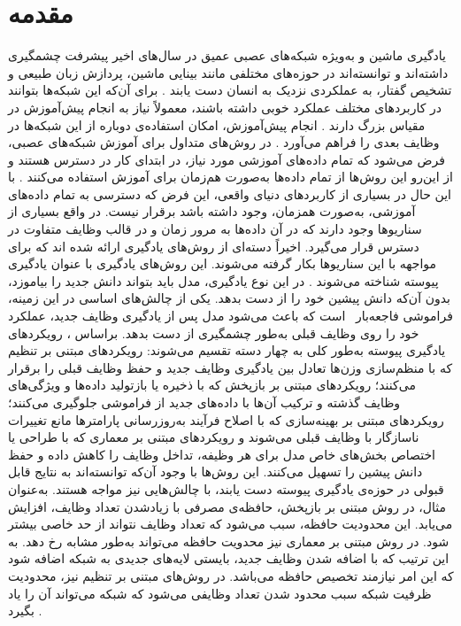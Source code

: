 \chapter{مقدمه}


یادگیری ماشین و به‌ویژه شبکه‌های عصبی عمیق در سال‌های اخیر پیشرفت چشمگیری داشته‌اند و توانسته‌اند در حوزه‌های مختلفی مانند بینایی ماشین، پردازش زبان طبیعی و تشخیص گفتار، به عملکردی نزدیک به انسان دست یابند \cite{attention_is_all_u_need-46,Mask-R-CNN-20,Deep-Residual-Learning-21,
	bert-10}.
برای آن‌که این شبکه‌ها بتوانند در کاربردهای مختلف عملکرد خوبی داشته باشند، معمولاً نیاز به انجام پیش‌آموزش در مقیاس بزرگ دارند \cite{attention_is_all_u_need-46,An-image-is-worth-11}.
انجام پیش‌آموزش، امکان استفاده‌ی دوباره‌‌ از این شبکه‌ها در وظایف
بعدی را فراهم می‌آورد \cite{Multi-Task-Feature-Learning-4}.
در روش‌های متداول برای آموزش شبکه‌های عصبی، فرض می‌شود که تمام داده‌های آموزشی مورد نیاز، در ابتدای کار در دسترس هستند و از این‌رو این روش‌ها از تمام داده‌ها به‌صورت هم‌زمان برای آموزش استفاده می‌کنند \cite{l2p}. با این حال در بسیاری از کاربردهای دنیای واقعی، این فرض که دسترسی به تمام داده‌های آموزشی، به‌صورت همزمان، وجود داشته باشد برقرار نیست. در واقع بسیاری از سناریوها وجود دارند که در آن داده‌ها به مرور زمان و در قالب وظایف متفاوت در دسترس قرار می‌گیرد. اخیراً دسته‌ای از روش‌های یادگیری ارائه شده اند که برای مواجهه با این سناریوها بکار گرفته می‌شوند. این روش‌های یادگیری با عنوان یادگیری پیوسته
 شناخته ‌می‌شوند \cite{1,2}. در این نوع یادگیری، مدل باید بتواند دانش جدید را بیاموزد، بدون آن‌که دانش پیشین خود را از دست بدهد. یکی از چالش‌های اساسی در این زمینه، فراموشی فاجعه‌بار~\cite{Catastrophic_forgetting} است که باعث می‌شود مدل پس از یادگیری وظایف جدید، عملکرد خود را روی وظایف قبلی به‌طور چشمگیری از دست بدهد. براساس \cite{1}، رویکردهای یادگیری پیوسته به‌طور کلی به چهار دسته تقسیم می‌شوند: رویکردهای مبتنی بر تنظیم که با منظم‌سازی وزن‌ها تعادل بین یادگیری وظایف جدید و حفظ وظایف قبلی را برقرار می‌کنند؛ رویکردهای مبتنی بر بازپخش که با ذخیره یا بازتولید داده‌ها و ویژگی‌های وظایف گذشته و ترکیب آن‌ها با داده‌های جدید از فراموشی جلوگیری می‌کنند؛ رویکردهای مبتنی بر بهینه‌سازی که با اصلاح فرآیند به‌روزرسانی پارامترها مانع تغییرات ناسازگار با وظایف قبلی می‌شوند و رویکردهای مبتنی بر معماری که با طراحی یا اختصاص بخش‌های خاص مدل برای هر وظیفه، تداخل وظایف را کاهش داده و حفظ دانش پیشین را تسهیل می‌کنند. این روش‌ها با وجود آن‌که توانسته‌اند به نتایج قابل قبولی در حوزه‌ی یادگیری پیوسته دست یابند، با چالش‌هایی نیز مواجه هستند. به‌عنوان مثال، در روش مبتنی بر بازپخش، حافظه‌ی مصرفی با زیادشدن تعداد وظایف، افزایش می‌یابد. این محدودیت حافظه، سبب می‌شود که تعداد وظایف نتواند از حد خاصی بیشتر شود. در روش مبتنی بر معماری نیز محدویت حافظه می‌تواند به‌طور مشابه رخ دهد. به این ترتیب که با اضافه شدن وظایف جدید، بایستی لایه‌های جدیدی به شبکه اضافه شود که این امر نیازمند تخصیص حافظه می‌باشد. در روش‌های مبتنی بر تنظیم نیز، محدودیت ظرفیت شبکه سبب محدود شدن تعداد وظایفی می‌شود که شبکه می‌تواند آن را یاد بگیرد \cite{1,2}. 
 
